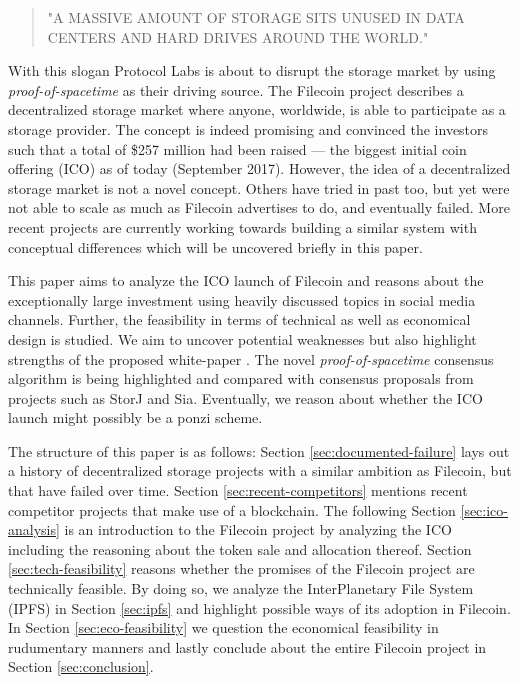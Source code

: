 \documentclass[conference]{IEEEtran}
\begin{document}
\begin{quote}"A MASSIVE AMOUNT OF STORAGE SITS UNUSED IN DATA CENTERS AND HARD DRIVES AROUND THE WORLD." \cite{filecoin-io}\end{quote}
With this slogan Protocol Labs is about to disrupt the storage market by using \textit{proof-of-spacetime} as their driving source.
The Filecoin project describes a decentralized storage market where anyone, worldwide, is able to participate as a storage provider.
The concept is indeed promising and convinced the investors such that a total of \$257 million had been raised –-- the biggest initial coin offering (ICO) as of today (September 2017).
However, the idea of a decentralized storage market is not a novel concept.
Others\cite{tribler}\cite{mojo-nation} have tried in past too, but yet were not able to scale as much as Filecoin advertises to do, and eventually failed.
More recent projects\cite{storj}\cite{sia} are currently working towards building a similar system with conceptual differences which will be uncovered briefly in this paper.

This paper aims to analyze the ICO launch of Filecoin and reasons about the exceptionally large investment using heavily discussed topics in social media channels.
Further, the feasibility in terms of technical as well as economical design is studied.
We aim to uncover potential weaknesses but also highlight strengths of the proposed white-paper \cite{filecoin}.
The novel \textit{proof-of-spacetime} consensus algorithm is being highlighted and compared with consensus proposals from projects such as StorJ and Sia.
Eventually, we reason about whether the ICO launch might possibly be a ponzi scheme.

The structure of this paper is as follows: Section \ref{sec:documented-failure} lays out a history of decentralized storage projects with a similar ambition as Filecoin, but that have failed over time. 
Section \ref{sec:recent-competitors} mentions recent competitor projects that make use of a blockchain.
The following Section \ref{sec:ico-analysis} is an introduction to the Filecoin project by analyzing the ICO including the reasoning about the token sale and allocation thereof.
Section \ref{sec:tech-feasibility} reasons whether the promises of the Filecoin project are technically feasible.
By doing so, we analyze the InterPlanetary File System (IPFS)\cite{ipfs-whitepaper} in Section \ref{sec:ipfs} and highlight possible ways of its adoption in Filecoin.
In Section \ref{sec:eco-feasibility} we question the economical feasibility in rudumentary manners and lastly conclude about the entire Filecoin project in Section \ref{sec:conclusion}.
\end{document}
